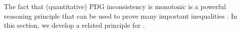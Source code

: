 The fact that (quantitative) PDG inconsistency  is monotonic
is a powerful reasoning principle that can be used to prove many important inequalities \citep{one-true-loss}. 
In this section, we develop a related principle for \scibility.
%
%
%
%
%
%
